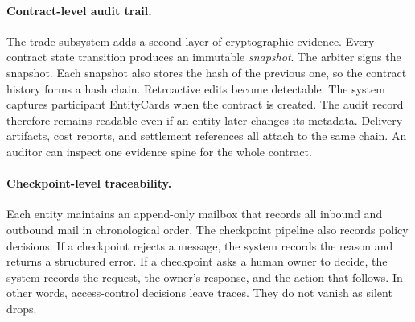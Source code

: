 \documentclass{llmxive}
\begin{document}
\paragraph{Contract-level audit trail.}
The trade subsystem adds a second layer of cryptographic evidence.
Every contract state transition produces an immutable \emph{snapshot}. The arbiter signs the snapshot. Each snapshot also stores the hash of the previous one, so the contract history forms a hash chain. Retroactive edits become detectable.
The system captures participant EntityCards when the contract is created. The audit record therefore remains readable even if an entity later changes its metadata. Delivery artifacts, cost reports, and settlement references all attach to the same chain. An auditor can inspect one evidence spine for the whole contract.

\paragraph{Checkpoint-level traceability.}
Each entity maintains an append-only mailbox that records all inbound and outbound mail in chronological order. 
The checkpoint pipeline also records policy decisions. If a checkpoint rejects a message, the system records the reason and returns a structured error. If a checkpoint asks a human owner to decide, the system records the request, the owner's response, and the action that follows. In other words, access-control decisions leave traces. They do not vanish as silent drops.
\end{document}
